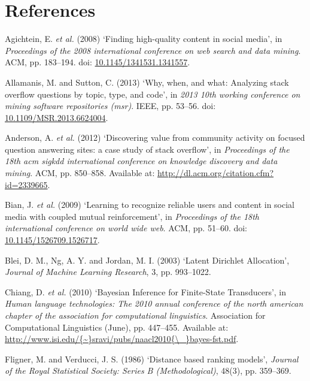 \documentclass[11pt,preprint, authoryear]{article}
\numberwithin{equation}{section}
\numberwithin{figure}{section}
\begin{document}
\newpage

\section*{References}

\hypertarget{refs}{}
\hypertarget{ref-Agichtein2008}{}
Agichtein, E. \emph{et al.} (2008) `Finding high-quality content in
social media', in \emph{Proceedings of the 2008 international conference
on web search and data mining}. ACM, pp. 183--194. doi:
\href{https://doi.org/10.1145/1341531.1341557}{10.1145/1341531.1341557}.

\hypertarget{ref-Allamanis2013}{}
Allamanis, M. and Sutton, C. (2013) `Why, when, and what: Analyzing
stack overflow questions by topic, type, and code', in \emph{2013 10th
working conference on mining software repositories (msr)}. IEEE, pp.
53--56. doi:
\href{https://doi.org/10.1109/MSR.2013.6624004}{10.1109/MSR.2013.6624004}.

\hypertarget{ref-Anderson2012}{}
Anderson, A. \emph{et al.} (2012) `Discovering value from community
activity on focused question answering sites: a case study of stack
overflow', in \emph{Proceedings of the 18th acm sigkdd international
conference on knowledge discovery and data mining}. ACM, pp. 850--858.
Available at: \url{http://dl.acm.org/citation.cfm?id=2339665}.

\hypertarget{ref-Bian2009}{}
Bian, J. \emph{et al.} (2009) `Learning to recognize reliable users and
content in social media with coupled mutual reinforcement', in
\emph{Proceedings of the 18th international conference on world wide
web}. ACM, pp. 51--60. doi:
\href{https://doi.org/10.1145/1526709.1526717}{10.1145/1526709.1526717}.

\hypertarget{ref-Blei2003}{}
Blei, D. M., Ng, A. Y. and Jordan, M. I. (2003) `Latent Dirichlet
Allocation', \emph{Journal of Machine Learning Research}, 3, pp.
993--1022.

\hypertarget{ref-Chiang2010}{}
Chiang, D. \emph{et al.} (2010) `Bayesian Inference for Finite-State
Transducers', in \emph{Human language technologies: The 2010 annual
conference of the north american chapter of the association for
computational linguistics}. Association for Computational Linguistics
(June), pp. 447--455. Available at:
\href{http://www.isi.edu/\%7B~\%7Dsravi/pubs/naacl2010\%7B/_\%7Dbayes-fst.pdf}{http://www.isi.edu/\{\textasciitilde{}\}sravi/pubs/naacl2010\{\textbackslash{}\_\}bayes-fst.pdf}.

\hypertarget{ref-Fligner1986}{}
Fligner, M. and Verducci, J. S. (1986) `Distance based ranking models',
\emph{Journal of the Royal Statistical Society: Series B
(Methodological)}, 48(3), pp. 359--369.
\end{document}
